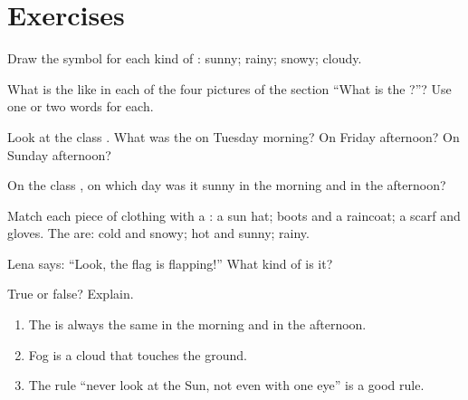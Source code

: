 \section{Exercises}

\begin{exercise}[$\star$]\label{exo:g1:watching-the-weather:1}
Draw the symbol for each kind of : sunny; rainy; snowy; cloudy.
\end{exercise}

\begin{exercise}[$\star$]\label{exo:g1:watching-the-weather:2}
What is the  like in each of the four pictures of the section
``What is the ?''? Use one or two words for each.
\end{exercise}

\begin{exercise}[$\star$]\label{exo:g1:watching-the-weather:3}
Look at the class . What was the  on Tuesday morning?
On Friday afternoon? On Sunday afternoon?
\end{exercise}

\begin{exercise}[$\star$]\label{exo:g1:watching-the-weather:4}
On the class , on which day was it sunny in the morning and in
the afternoon?
\end{exercise}

\begin{exercise}[$\star$]\label{exo:g1:watching-the-weather:5}
Match each piece of clothing with a : a sun hat; boots and a
raincoat; a scarf and gloves. The  are: cold and snowy; hot and
sunny; rainy.
\end{exercise}

\begin{exercise}[$\star$]\label{exo:g1:watching-the-weather:6}
Lena says: ``Look, the flag is flapping!'' What kind of  is it?
\end{exercise}

\begin{exercise}[$\star$]\label{exo:g1:watching-the-weather:7}
True or false? Explain.
\begin{enumerate}
  \item The  is always the same in the morning and in the afternoon.
  \item Fog is a cloud that touches the ground.
  \item The rule ``never look at the Sun, not even with one eye'' is a good rule.
\end{enumerate}
\end{exercise}

